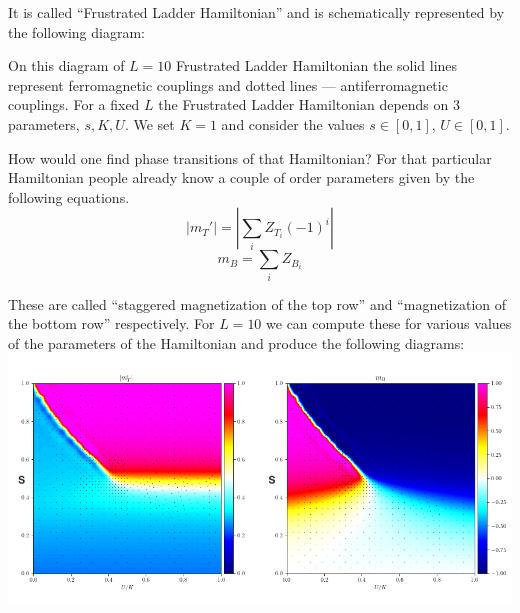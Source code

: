 \documentclass[american,aps,pra,reprint,floatfix,nofootinbib,superscriptaddress]{revtex4-2}
\newcommand{\abs}[1]{\left|#1\right|}
\newcommand{\absmt}{\abs{m_{T}'}}
\begin{document}
It is called ``Frustrated Ladder Hamiltonian'' and is schematically represented
by the following diagram:
\begin{center}
  \pgfmathparse{\columnwidth/10.7cm}%
  \edef\tikzscale{\pgfmathresult}%
\end{center}
On this diagram of $L=10$ Frustrated Ladder Hamiltonian
the solid lines represent ferromagnetic couplings and
dotted lines --- antiferromagnetic couplings. For a fixed $L$
the Frustrated Ladder Hamiltonian depends on 3 parameters, $s, K, U$.
We set $K=1$ and consider the values $s\in[0,1]$, $U\in[0,1]$.

How would one find phase transitions of that Hamiltonian? For that particular
Hamiltonian people already know a couple of order parameters given by the
following equations.
\begin{equation}
  \label{eq:mt}
  \absmt = \abs{\sum_i Z_{T_i}(-1)^i}
\end{equation}
\begin{equation}
  \label{eq:mb}
  m_B = \sum_i Z_{B_i}
\end{equation}

These are called ``staggered magnetization of the top row'' and ``magnetization
of the bottom row'' respectively. For $L=10$ we can compute these for various
values of the parameters of the Hamiltonian and produce the following diagrams:
\includegraphics[width=\columnwidth]{lanczos_chi0_gp.png}
\end{document}
